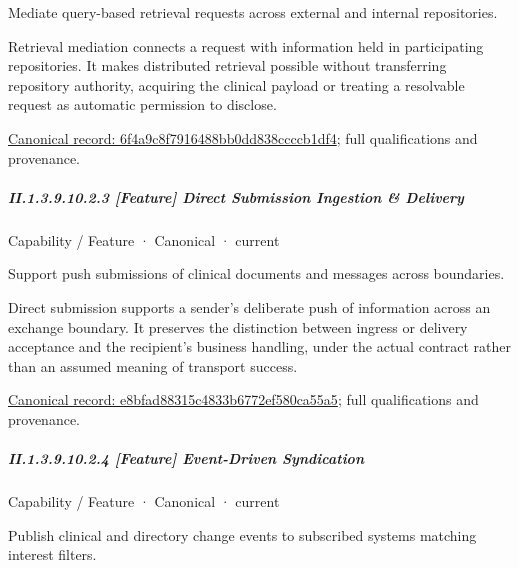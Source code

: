Mediate query-based retrieval requests across external and internal repositories.



Retrieval mediation connects a request with information held in participating repositories. It makes distributed retrieval possible without transferring repository authority, acquiring the clinical payload or treating a resolvable request as automatic permission to disclose.


{\footnotesize \href{../../../../continuum/strategy/capability/feature/6f4a9c8f7916488bb0dd838ccccb1df4.md}{Canonical record: 6f4a9c8f7916488bb0dd838ccccb1df4}; full qualifications and provenance.}\par
\subparagraph*{II.1.3.9.10.2.3 [Feature] Direct Submission Ingestion \& Delivery}
\label{navigation:II.1.3.9.10.2.3}

\label{element:e8bfad88315c4833b6772ef580ca55a5}
{\small Capability / Feature · Canonical · current}\par

Support push submissions of clinical documents and messages across boundaries.



Direct submission supports a sender's deliberate push of information across an exchange boundary. It preserves the distinction between ingress or delivery acceptance and the recipient's business handling, under the actual contract rather than an assumed meaning of transport success.


{\footnotesize \href{../../../../continuum/strategy/capability/feature/e8bfad88315c4833b6772ef580ca55a5.md}{Canonical record: e8bfad88315c4833b6772ef580ca55a5}; full qualifications and provenance.}\par
\subparagraph*{II.1.3.9.10.2.4 [Feature] Event-Driven Syndication}
\label{navigation:II.1.3.9.10.2.4}

\label{element:30bb720ed4e64a47a1fcf3be811c1931}
{\small Capability / Feature · Canonical · current}\par

Publish clinical and directory change events to subscribed systems matching interest filters.



